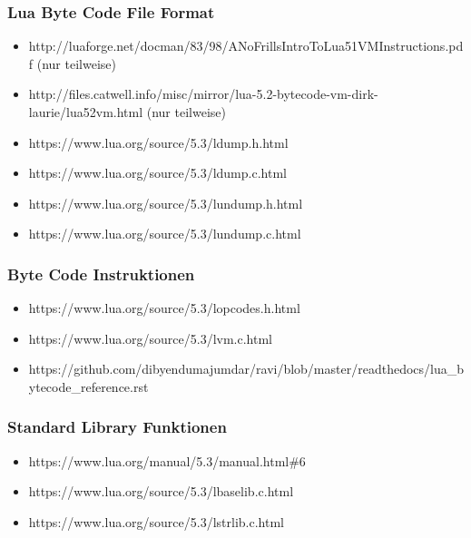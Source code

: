 \documentclass{article}
\begin{document}
\subsubsection*{Lua Byte Code File Format}\hypertarget{lua-byte-code-file-format}{}\label{lua-byte-code-file-format}

\begin{itemize}
\item http://luaforge.net/docman/83/98/ANoFrillsIntroToLua51VMInstructions.pdf (nur teilweise)
\item http://files.catwell.info/misc/mirror/lua-5.2-bytecode-vm-dirk-laurie/lua52vm.html (nur teilweise)
\item https://www.lua.org/source/5.3/ldump.h.html
\item https://www.lua.org/source/5.3/ldump.c.html
\item https://www.lua.org/source/5.3/lundump.h.html
\item https://www.lua.org/source/5.3/lundump.c.html
\end{itemize}

\subsubsection*{Byte Code Instruktionen}\hypertarget{byte-code-instruktionen-2}{}\label{byte-code-instruktionen-2}

\begin{itemize}
\item https://www.lua.org/source/5.3/lopcodes.h.html
\item https://www.lua.org/source/5.3/lvm.c.html
\item https://github.com/dibyendumajumdar/ravi/blob/master/readthedocs/lua\_bytecode\_reference.rst
\end{itemize}

\subsubsection*{Standard Library Funktionen}\hypertarget{standard-library-funktionen-2}{}\label{standard-library-funktionen-2}

\begin{itemize}
\item https://www.lua.org/manual/5.3/manual.html\#6
\item https://www.lua.org/source/5.3/lbaselib.c.html
\item https://www.lua.org/source/5.3/lstrlib.c.html
\end{itemize}
\end{document}
